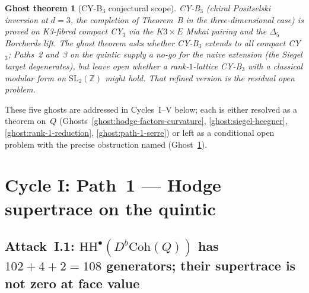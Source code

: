 \documentclass[11pt]{amsart}
\newtheorem{ghost}[theorem]{Ghost theorem}
\providecommand{\Z}{\mathbb{Z}}
\providecommand{\HH}{\mathrm{HH}}
\providecommand{\SL}{\mathrm{SL}}
\providecommand{\Coh}{\mathrm{Coh}}
\begin{document}
\begin{ghost}[CY-B$_3$ conjectural scope]
\label{ghost:cy-b3-scope}
CY-B$_3$ (chiral Positselski inversion at $d = 3$, the completion of
Theorem~B in the three-dimensional case) is proved on K3-fibred
compact CY$_3$ via the $K3 \times E$ Mukai pairing and the
$\Delta_5$ Borcherds lift. The ghost theorem asks whether CY-B$_3$
extends to all compact CY$_3$; Paths~2 and~3 on the quintic supply
a no-go for the naive extension (the Siegel target degenerates), but
leave open whether a rank-$1$-lattice CY-B$_3$ with a classical
modular form on $\SL_2(\Z)$ might hold. That refined version is
the residual open problem.
\end{ghost}

These five ghosts are addressed in Cycles~I--V below; each is
either resolved as a theorem on~$Q$ (Ghosts~\ref{ghost:hodge-factors-curvature},
\ref{ghost:siegel-heegner}, \ref{ghost:rank-1-reduction},
\ref{ghost:path-1-serre}) or left as a conditional open problem
with the precise obstruction named (Ghost~\ref{ghost:cy-b3-scope}).

\section{Cycle I: Path~1 --- Hodge supertrace on the quintic}
\label{sec:cycle-1-hodge-quintic}

\subsection{Attack~I.1: $\HH^\bullet(D^b\Coh(Q))$ has $102 + 4 + 2 = 108$
generators; their supertrace is not zero at face value}
\end{document}
